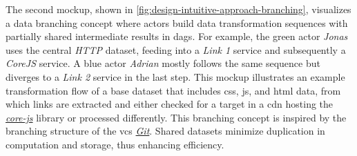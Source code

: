 The second mockup, shown in \cref{fig:design-intuitive-approach-branching}, visualizes a data branching concept where actors build data transformation sequences with partially shared intermediate results in \acp{dag}.
For example, the green actor \textit{Jonas} uses the central \textit{HTTP} dataset, feeding into a \textit{Link 1} service and subsequently a \textit{CoreJS} service.
A blue actor \textit{Adrian} mostly follows the same sequence but diverges to a \textit{Link 2} service in the last step.
This mockup illustrates an example transformation flow of a base dataset that includes \ac{css}, \ac{js}, and \ac{html} data, from which links are extracted and either checked for a target in a \ac{cdn} hosting the \href{https://github.com/zloirock/core-js}{\textit{core-js}} library or processed differently.
This branching concept is inspired by the branching structure of the \ac{vcs} \href{https://git-scm.com/}{\textit{Git}}.
Shared datasets minimize duplication in computation and storage, thus enhancing efficiency.

